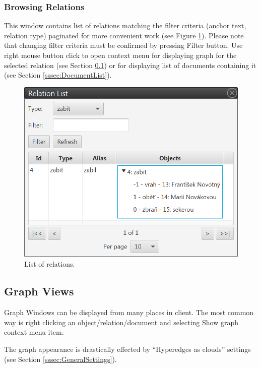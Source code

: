\subsubsection{Browsing Relations}

This window contains list of relations matching the filter criteria (anchor
text, relation type) paginated for more convenient work (see Figure
\ref{fig:RelationList}). Please note that changing filter criteria must be
confirmed by pressing Filter button. Use right mouse button click to open
context menu for displaying graph for the selected relation (see Section
\ref{ssec:Graphs}) or for displaying list of documents containing it (see
Section \ref{sssec:DocumentList}).

\begin{figure}[!htb]
        \centering
        \includegraphics[width=\textwidth]{Images/relationlist}
        \caption{List of relations.}
        \label{fig:RelationList}
\end{figure}

\subsection{Graph Views}
\label{ssec:Graphs}

Graph Windows can be displayed from many places in \textan{} client. The most
common way is right clicking an object/relation/document and selecting Show
graph context menu item.

The graph appearance is drastically effected by ``Hyperedges as clouds'' settings
(see Section \ref{sssec:GeneralSettings}).

